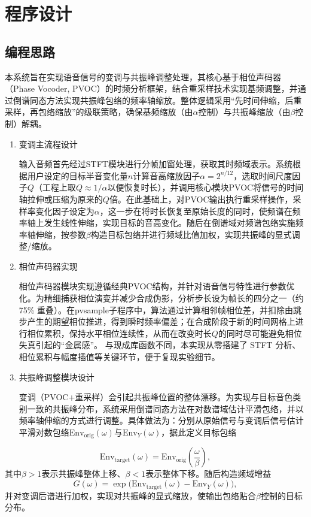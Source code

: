 \documentclass[12pt,a4paper]{article}
\begin{document}
\section{程序设计}
\subsection{编程思路}

本系统旨在实现语音信号的变调与共振峰调整处理，其核心基于相位声码器（Phase Vocoder, PVOC）的时频分析框架，结合重采样技术实现基频调整，并通过倒谱同态方法实现共振峰包络的频率轴缩放。整体逻辑采用“先时间伸缩，后重采样，再包络缩放”的级联策略，确保基频缩放（由$\alpha$控制）与共振峰缩放（由$\beta$控制）解耦。

\begin{enumerate}[(1)]
\item 变调主流程设计


输入音频首先经过STFT模块进行分帧加窗处理，获取其时频域表示。系统根据用户设定的目标半音变化量$n$计算音高缩放因子$\alpha=2^{n/12}$，选取时间尺度因子$Q$（工程上取$Q\approx 1/\alpha$以便恢复时长），并调用核心模块PVOC将信号的时间轴拉伸或压缩为原来的$Q$倍。在此基础上，对PVOC输出执行重采样操作，采样率变化因子设定为$\alpha$，这一步在将时长恢复至原始长度的同时，使频谱在频率轴上发生线性伸缩，实现目标的音高变化。随后在倒谱域对频谱包络实施频率轴伸缩，按参数$\beta$构造目标包络并进行频域比值加权，实现共振峰的显式调整/缩放。


\item 相位声码器实现


相位声码器模块实现遵循经典PVOC结构，并针对语音信号特性进行参数优化。为精细捕获相位演变并减少合成伪影，分析步长设为帧长的四分之一（约75\%
重叠）。在pvsample子程序中，算法通过计算相邻帧相位差，并扣除由跳步产生的期望相位推进，得到瞬时频率偏差；在合成阶段于新的时间网格上进行相位累积，保持水平相位连续性，从而在改变时长$Q$的同时尽可能避免相位失真引起的“金属感”。
与现成库函数不同，本实现从零搭建了 STFT 分析、相位累积与幅度插值等关键环节，便于复现实验细节。


\item 共振峰调整模块设计


变调（PVOC+重采样）会引起共振峰位置的整体漂移。为实现与目标音色类别一致的共振峰分布，系统采用倒谱同态方法在对数谱域估计平滑包络，并以频率轴伸缩的方式进行调整。具体做法为：分别从原始信号与变调后信号估计平滑对数包络$\mathrm{Env}_{\mathrm{orig}}(\omega)$与$\mathrm{Env}_{Y}(\omega)$，据此定义目标包络
\end{enumerate}

$$\mathrm{Env}_{\mathrm{target}}(\omega)=\mathrm{Env}_{\mathrm{orig}}\!\left(\frac{\omega}{\beta}\right),$$
其中$\beta>1$表示共振峰整体上移、$\beta<1$表示整体下移。随后构造频域增益
$$G(\omega)=\exp\big(\mathrm{Env}_{\mathrm{target}}(\omega)-\mathrm{Env}_{Y}(\omega)\big),$$
并对变调后谱进行加权，实现对共振峰的显式缩放，使输出包络贴合$\beta$控制的目标分布。
\end{document}
